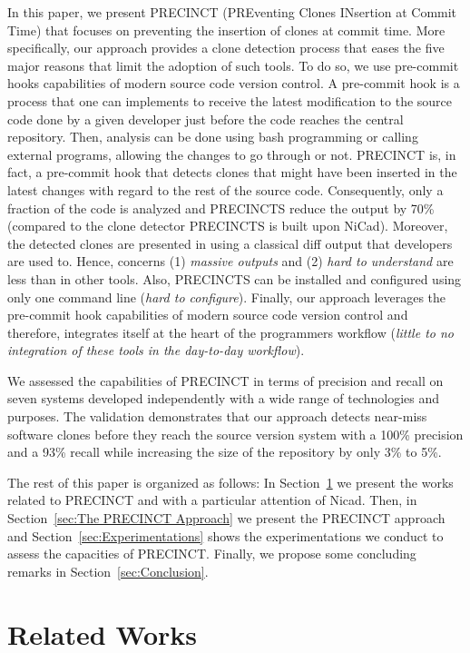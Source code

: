 \documentclass[conference]{IEEEtran}
\begin{document}
In this paper, we present PRECINCT (PREventing Clones INsertion at Commit Time) that focuses on preventing the insertion of clones at commit time.
More specifically, our approach provides a clone detection process that eases the five major reasons that limit the adoption of such tools.
To do so, we use pre-commit hooks capabilities of modern source code version control.
A pre-commit hook is a process that one can implements to receive the latest modification to the source code done by a given developer just before the code reaches the central repository.
Then, analysis can be done using bash programming or calling external programs, allowing the changes to go through or not.
PRECINCT is, in fact, a pre-commit hook that detects clones that might have been inserted in the latest changes with regard to the rest of the source code.
Consequently, only a fraction of the code is analyzed and PRECINCTS reduce the output by 70\% (compared to the clone detector PRECINCTS is built upon NiCad\cite{Cordy2011}).
Moreover, the detected clones are presented in using a classical diff output that developers are used to.
Hence, concerns (1) \textit{massive outputs} and (2) \textit{hard to understand} are less than in other tools.
Also, PRECINCTS can be installed and configured using only one command line (\textit{hard to configure}).
Finally, our approach leverages the pre-commit hook capabilities of modern source code version control and therefore, integrates itself at the heart of the programmers workflow (\textit{little to no integration of these tools in the day-to-day workflow}).

We assessed the capabilities of PRECINCT in terms of precision and recall on seven systems developed independently with a wide range of technologies and purposes.
The validation demonstrates that our approach detects near-miss software clones before they reach the source version system with a 100\% precision and a 93\% recall while increasing the size of the repository by only 3\% to 5\%.

The rest of this paper is organized as follows: In Section~\ref{sec:Related Works} we present the works related to PRECINCT and with a particular attention of Nicad.
Then, in Section~\ref{sec:The PRECINCT Approach} we present the PRECINCT approach and Section~\ref{sec:Experimentations} shows the experimentations we conduct to assess the capacities of PRECINCT.
Finally, we propose some concluding remarks in Section~\ref{sec:Conclusion}.

\section{Related Works}
\label{sec:Related Works}
\end{document}
